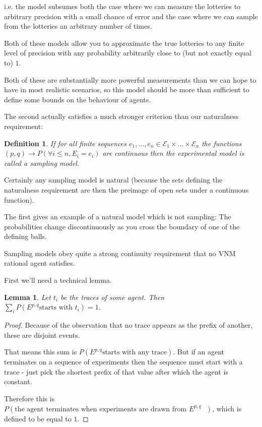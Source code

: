 \documentclass[a4paper]{book}
\newtheorem{definition}{Definition}
\newtheorem{lemma}{Lemma}
\begin{document}
i.e. the model subsumes both the case where we can measure  the lotteries to arbitrary
precision with a small chance of error and the case where we can sample from the
lotteries an arbitrary number of times.

Both of these models allow you to approximate the true lotteries to any
finite level of precision with any probability arbitrarily close to (but not exactly
equal to) $1$.

Both of these are substantially more powerful measurements than we can hope to have in
most realistic scenarios, so this model should be more than sufficient to define some
bounds on the behaviour of agents.

The second actually satisfies a much stronger criterion than our naturalness
requirement:

\begin{definition}
If for all finite sequences $e_1, \ldots, e_n \in \mathcal{E}_1 \times \ldots \times \mathcal{E}_n$
the functions $(p, q) \to P(\forall i \leq n, E_i = e_i)$ are continuous then 
the experimental model is called a sampling model.
\end{definition}

Certainly any sampling model is natural (because the sets defining the naturalness
requirement are then the preimage of open sets under a continuous function).

The first gives an example of a natural model which is not sampling: The probabilities
change discontinuously as you cross the boundary of one of the defining balls.

Sampling models obey quite a strong continuity requirement that no
VNM rational agent satisfies.

First we'll need a technical lemma.

\begin{lemma}
Let $t_i$ be the traces of some agent. Then 
$\sum\limits_i P(E^{p, q} \text{starts with $t_i$}) = 1$.
\end{lemma}

\begin{proof}
Because of the observation that no trace appears as the prefix of another, these are disjoint events.

That means this sum is $P(E^{p, q} \text{starts with any trace})$.
But if an agent terminates on a sequence of experiments then the
sequence must start with a trace - just pick the shortest prefix of that value
after which the agent is constant.

Therefore this is
$P(\text{the agent terminates when experiments are drawn from $E^{p, q}$ })$,
which is defined to be equal to $1$.
\end{proof}
\end{document}
